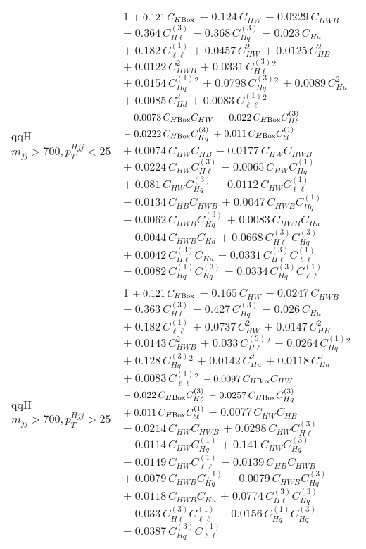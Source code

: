 \begin{tabular}{l|p{}}
    qqH $m_{jj} > 700, p_{T}^{Hjj} < 25$ & 1 $+\;0.121\,C_{H\rm{Box}}$ $-\;0.124\,C_{HW}$ $+\;0.0229\,C_{HWB}$ $-\;0.364\,C^{(3)}_{H\ell}$ $-\;0.368\,C^{(3)}_{Hq}$ $-\;0.023\,C_{Hu}$ $+\;0.182\,C^{(1)}_{\ell\ell}$ $+\;0.0457\,C_{HW}^{2}$ $+\;0.0125\,C_{HB}^{2}$ $+\;0.0122\,C_{HWB}^{2}$ $+\;0.0331\,C^{(3)}_{H\ell}^{2}$ $+\;0.0154\,C^{(1)}_{Hq}^{2}$ $+\;0.0798\,C^{(3)}_{Hq}^{2}$ $+\;0.0089\,C_{Hu}^{2}$ $+\;0.0085\,C_{Hd}^{2}$ $+\;0.0083\,C^{(1)}_{\ell\ell}^{2}$ $-\;0.0073\,C_{H\rm{Box}}C_{HW}$ $-\;0.022\,C_{H\rm{Box}}C^{(3)}_{H\ell}$ $-\;0.0222\,C_{H\rm{Box}}C^{(3)}_{Hq}$ $+\;0.011\,C_{H\rm{Box}}C^{(1)}_{\ell\ell}$ $+\;0.0074\,C_{HW}C_{HB}$ $-\;0.0177\,C_{HW}C_{HWB}$ $+\;0.0224\,C_{HW}C^{(3)}_{H\ell}$ $-\;0.0065\,C_{HW}C^{(1)}_{Hq}$ $+\;0.081\,C_{HW}C^{(3)}_{Hq}$ $-\;0.0112\,C_{HW}C^{(1)}_{\ell\ell}$ $-\;0.0134\,C_{HB}C_{HWB}$ $+\;0.0047\,C_{HWB}C^{(1)}_{Hq}$ $-\;0.0062\,C_{HWB}C^{(3)}_{Hq}$ $+\;0.0083\,C_{HWB}C_{Hu}$ $-\;0.0044\,C_{HWB}C_{Hd}$ $+\;0.0668\,C^{(3)}_{H\ell}C^{(3)}_{Hq}$ $+\;0.0042\,C^{(3)}_{H\ell}C_{Hu}$ $-\;0.0331\,C^{(3)}_{H\ell}C^{(1)}_{\ell\ell}$ $-\;0.0082\,C^{(1)}_{Hq}C^{(3)}_{Hq}$ $-\;0.0334\,C^{(3)}_{Hq}C^{(1)}_{\ell\ell}$ \\
    qqH $m_{jj} > 700, p_{T}^{Hjj} > 25$ & 1 $+\;0.121\,C_{H\rm{Box}}$ $-\;0.165\,C_{HW}$ $+\;0.0247\,C_{HWB}$ $-\;0.363\,C^{(3)}_{H\ell}$ $-\;0.427\,C^{(3)}_{Hq}$ $-\;0.026\,C_{Hu}$ $+\;0.182\,C^{(1)}_{\ell\ell}$ $+\;0.0737\,C_{HW}^{2}$ $+\;0.0147\,C_{HB}^{2}$ $+\;0.0143\,C_{HWB}^{2}$ $+\;0.033\,C^{(3)}_{H\ell}^{2}$ $+\;0.0264\,C^{(1)}_{Hq}^{2}$ $+\;0.128\,C^{(3)}_{Hq}^{2}$ $+\;0.0142\,C_{Hu}^{2}$ $+\;0.0118\,C_{Hd}^{2}$ $+\;0.0083\,C^{(1)}_{\ell\ell}^{2}$ $-\;0.0097\,C_{H\rm{Box}}C_{HW}$ $-\;0.022\,C_{H\rm{Box}}C^{(3)}_{H\ell}$ $-\;0.0257\,C_{H\rm{Box}}C^{(3)}_{Hq}$ $+\;0.011\,C_{H\rm{Box}}C^{(1)}_{\ell\ell}$ $+\;0.0077\,C_{HW}C_{HB}$ $-\;0.0214\,C_{HW}C_{HWB}$ $+\;0.0298\,C_{HW}C^{(3)}_{H\ell}$ $-\;0.0114\,C_{HW}C^{(1)}_{Hq}$ $+\;0.141\,C_{HW}C^{(3)}_{Hq}$ $-\;0.0149\,C_{HW}C^{(1)}_{\ell\ell}$ $-\;0.0139\,C_{HB}C_{HWB}$ $+\;0.0079\,C_{HWB}C^{(1)}_{Hq}$ $-\;0.0079\,C_{HWB}C^{(3)}_{Hq}$ $+\;0.0118\,C_{HWB}C_{Hu}$ $+\;0.0774\,C^{(3)}_{H\ell}C^{(3)}_{Hq}$ $-\;0.033\,C^{(3)}_{H\ell}C^{(1)}_{\ell\ell}$ $-\;0.0156\,C^{(1)}_{Hq}C^{(3)}_{Hq}$ $-\;0.0387\,C^{(3)}_{Hq}C^{(1)}_{\ell\ell}$ \\
    \hline
\end{tabular}